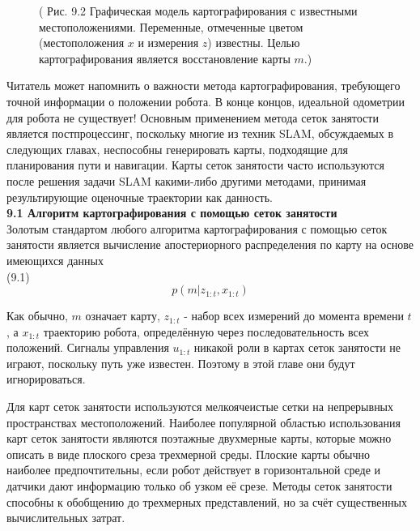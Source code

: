 \documentclass[10pt,a4paper]{article}
\begin{document}
\begin{figure}[H]
	\caption{ ( Рис. 9.2 Графическая модель картографирования с известными местоположениями. Переменные, отмеченные цветом (местоположения $x$ и измерения $z$) известны. Целью картографирования является восстановление карты $m$.)}
	\label{fig:92orig}
\end{figure}

Читатель может напомнить о важности метода картографирования, требующего точной информации о положении робота. В конце концов, идеальной одометрии для робота не существует! Основным применением метода сеток занятости является постпроцессинг, поскольку многие из техник SLAM, обсуждаемых в следующих главах, неспособны генерировать карты, подходящие для планирования пути и навигации. Карты сеток занятости часто используются после решения задачи SLAM какими-либо другими методами, принимая результирующие оценочные траектории как данность.\\

\textbf{9.1	Алгоритм картографирования с помощью сеток занятости}\\

Золотым стандартом любого алгоритма картографирования с помощью сеток занятости является вычисление апостериорного распределения по карту на основе имеющихся данных \\

(9.1)
$$p(m|z_{1:t},x_{1:t})$$

Как обычно, $m$ означает карту, $z_{1:t}$  - набор всех измерений до момента времени $t$, а  $x_{1:t}$ траекторию робота, определённую через последовательность всех положений. Сигналы управления $u_{1:t}$ никакой роли в картах сеток занятости не играют, поскольку путь уже известен. Поэтому в этой главе они будут игнорироваться.
 
Для карт сеток занятости используются мелкоячеистые сетки на непрерывных пространствах местоположений. Наиболее популярной областью использования карт сеток занятости являются поэтажные двухмерные карты, которые можно описать в виде плоского среза трехмерной среды. Плоские карты обычно наиболее предпочтительны, если робот действует в горизонтальной среде и датчики дают информацию только об узком её срезе. Методы сеток занятости способны к обобщению до трехмерных представлений, но за счёт существенных вычислительных затрат.
\end{document}
